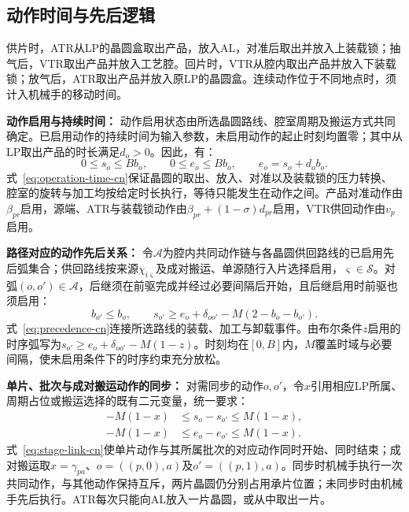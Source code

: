 \documentclass[final,5p,times,twocolumn]{elsarticle}
\begin{document}
\subsection{动作时间与先后逻辑}
\label{sec:model-time-cn}

供片时，ATR从LP的晶圆盒取出产品，放入AL，对准后取出并放入上装载锁；抽气后，VTR取出产品并放入工艺腔。回片时，VTR从腔内取出产品并放入下装载锁；放气后，ATR取出产品并放入原LP的晶圆盒。连续动作位于不同地点时，须计入机械手的移动时间。

\noindent\textbf{动作启用与持续时间：}
动作启用状态由所选晶圆路线、腔室周期及搬运方式共同确定。已启用动作的持续时间为输入参数，未启用动作的起止时刻均置零；其中从LP取出产品的时长满足$d_o>0$。因此，有：
\begin{equation}
0\le s_o\le B b_o,\qquad
0\le e_o\le B b_o,\qquad
e_o=s_o+d_ob_o.
\label{eq:operation-time-cn}
\end{equation}
式~\eqref{eq:operation-time-cn}保证晶圆的取出、放入、对准以及装载锁的压力转换、腔室的旋转与加工均按给定时长执行，等待只能发生在动作之间。产品对准动作由$\beta_{pr}$启用，源端、ATR与装载锁动作由$\beta_{pr}+(1-\sigma)d_{pr}$启用，VTR供回动作由$v_p$启用。

\noindent\textbf{路径对应的动作先后关系：}
令$\mathcal A$为腔内共同动作链与各晶圆供回路线的已启用先后弧集合；供回路线按来源$\chi_{i\varsigma}$及成对搬运、单源随行入片选择启用，$\varsigma\in\mathcal S$。对弧$(o,o')\in\mathcal A$，后继须在前驱完成并经过必要间隔后开始，且后继启用时前驱也须启用：
\begin{equation}
b_{o'}\le b_o,\qquad
s_{o'}\ge e_o+\delta_{oo'}-M(2-b_o-b_{o'}).
\label{eq:precedence-cn}
\end{equation}
式~\eqref{eq:precedence-cn}连接所选路线的装载、加工与卸载事件。由布尔条件$z$启用的时序弧写为$s_{o'}\ge e_o+\delta_{oo'}-M(1-z)$。时刻均在$[0,B]$内，$M$覆盖时域与必要间隔，使未启用条件下的时序约束充分放松。

\noindent\textbf{单片、批次与成对搬运动作的同步：}
对需同步的动作$o,o'$，令$x$引用相应LP所属、周期占位或搬运选择的既有二元变量，统一要求：
\begin{equation}
\begin{aligned}
-M(1-x)&\le s_o-s_{o'}\le M(1-x),\\
-M(1-x)&\le e_o-e_{o'}\le M(1-x).
\end{aligned}
\label{eq:stage-link-cn}
\end{equation}
式~\eqref{eq:stage-link-cn}使单片动作与其所属批次的对应动作同时开始、同时结束；成对搬运取$x=\gamma_{pa}$、$o=((p,0),a)$及$o'=((p,1),a)$。同步时机械手执行一次共同动作，与其他动作保持互斥，两片晶圆仍分别占用承片位置；未同步时由机械手先后执行。ATR每次只能向AL放入一片晶圆，或从中取出一片。
\end{document}
